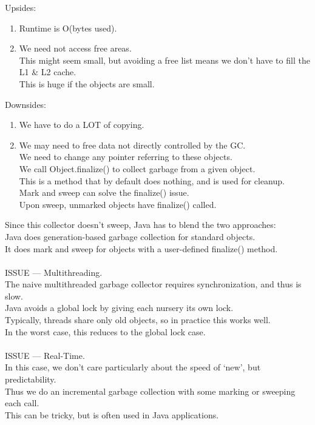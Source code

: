 \documentclass[../../lecture_notes.tex]{subfiles}
\begin{document}
\begin{enumerate} [itemsep=0mm]
		Upsides: \begin{enumerate} [itemsep=0mm]
				\item Runtime is O(bytes used).
				\item We need not access free areas.\\
					This might seem small, but avoiding a free list means 
						we don’t have to fill the L1 \& L2 cache.\\
					This is huge if the objects are small.
			\end{enumerate}
		Downsides: \begin{enumerate} [itemsep=0mm]
				\item We have to do a LOT of copying.
				\item We may need to free data not directly controlled by the GC.\\
				        We need to change any pointer referring to these objects.\\
				        We call Object.finalize() to collect garbage from a given object.\\
					This is a method that by default does nothing, and is used for cleanup.\\
					Mark and sweep can solve the finalize() issue.\\
					Upon sweep, unmarked objects have finalize() called.\\
				\end{enumerate} 
		Since this collector doesn’t sweep, Java has to blend the two approaches:\\
		Java does generation-based garbage collection for standard objects.\\
		It does mark and sweep for objects with a user-defined finalize() method.\\
\\
		ISSUE — Multithreading.\\
		The naive multithreaded garbage collector requires synchronization, and thus is slow.\\
		Java avoids a global lock by giving each nursery its own lock.\\
		Typically, threads share only old objects, so in practice this works well.\\
		In the worst case, this reduces to the global lock case.\\
\\
		ISSUE — Real-Time.\\
		In this case, we don’t care particularly about the speed of ‘new’, but predictability.\\
		Thus we do an incremental garbage collection with some marking or sweeping each call.\\
		This can be tricky, but is often used in Java applications.\\



\end{enumerate}
\end{document}
